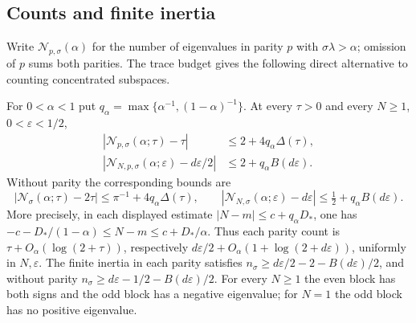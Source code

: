 \subsection{Counts and finite inertia}\label{sec:counts}
Write $\mathcal N_{p,\sigma}(\alpha)$ for the number of eigenvalues in
parity $p$ with $\sigma\lambda>\alpha$; omission of $p$ sums both parities.
The trace budget gives the following direct alternative to counting
concentrated subspaces.
\begin{theorem}\label{T3:thm:explicit}
For $0<\alpha<1$ put $q_\alpha=\max\{\alpha^{-1},(1-\alpha)^{-1}\}$.
At every $\tau>0$ and every $N\ge1$, $0<\varepsilon<1/2$,
\begin{equation}\label{eq:T3:A}
 \begin{aligned}
 |\mathcal N_{p,\sigma}(\alpha;\tau)-\tau|
   &\le2+4q_\alpha\Delta(\tau),\\
 |\mathcal N_{N,p,\sigma}(\alpha;\varepsilon)-d\varepsilon/2|
   &\le2+q_\alpha B(d\varepsilon).
 \end{aligned}
\end{equation}
Without parity the corresponding bounds are
\begin{equation}\label{eq:T3:Awhole}
 |\mathcal N_\sigma(\alpha;\tau)-2\tau|
 \le\pi^{-1}+4q_\alpha\Delta(\tau),\qquad
 |\mathcal N_{N,\sigma}(\alpha;\varepsilon)-d\varepsilon|
 \le\tfrac12+q_\alpha B(d\varepsilon).
\end{equation}
More precisely, in each displayed estimate $|N-m|\le c+q_\alpha D_*$,
one has $-c-D_* /(1-\alpha)\le N-m\le c+D_* /\alpha$.
Thus each parity count is $\tau+O_\alpha(\log(2+\tau))$, respectively
$d\varepsilon/2+O_\alpha(1+\log(2+d\varepsilon))$, uniformly in
$N,\varepsilon$. The finite inertia in each parity satisfies
$n_\sigma\ge d\varepsilon/2-2-B(d\varepsilon)/2$, and without parity
$n_\sigma\ge d\varepsilon-1/2-B(d\varepsilon)/2$.
For every $N\ge1$ the even block has both signs and the odd block has a
negative eigenvalue; for $N=1$ the odd block has no positive eigenvalue.
\end{theorem}

